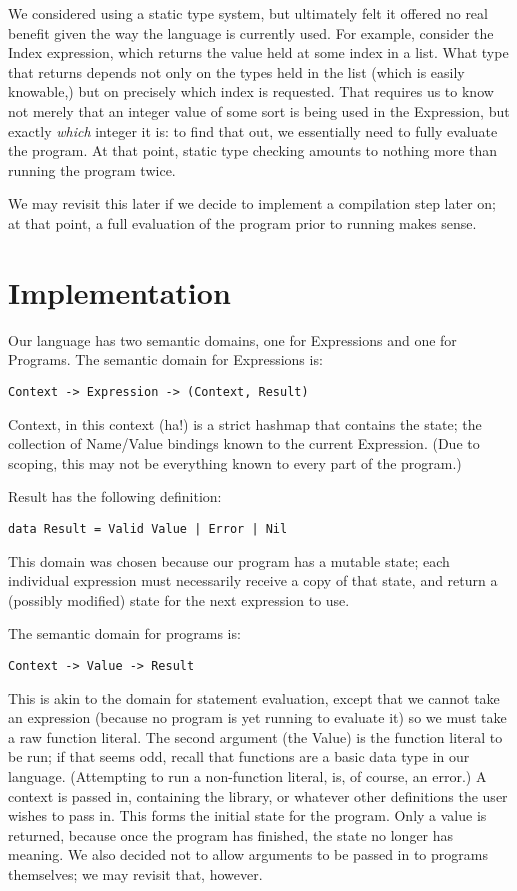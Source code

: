 \documentclass{article}
\begin{document}
We considered using a static type system, but ultimately felt it offered no real benefit given the way the language is currently used.  For example, consider the Index expression, which returns the value held at some index in a list.  What type that returns depends not only on the types held in the list (which is easily knowable,) but on precisely which index is requested.  That requires us to know not merely that an integer value of some sort is being used in the Expression, but exactly \emph{which} integer it is: to find that out, we essentially need to fully evaluate the program.  At that point, static type checking amounts to nothing more than running the program twice.

We may revisit this later if we decide to implement a compilation step later on; at that point, a full evaluation of the program prior to running makes sense.

\section*{Implementation}

Our language has two semantic domains, one for Expressions and one for Programs.  The semantic domain for Expressions is:

\begin{lstlisting}
Context -> Expression -> (Context, Result)
\end{lstlisting}

Context, in this context (ha!) is a strict hashmap that contains the state; the collection of Name/Value bindings known to the current Expression.  (Due to scoping, this may not be everything known to every part of the program.)

Result has the following definition:

\begin{lstlisting}
data Result = Valid Value | Error | Nil
\end{lstlisting}

This domain was chosen because our program has a mutable state; each individual expression must necessarily receive a copy of that state, and return a (possibly modified) state for the next expression to use.

The semantic domain for programs is:

\begin{lstlisting}
Context -> Value -> Result
\end{lstlisting}

This is akin to the domain for statement evaluation, except that we cannot take an expression (because no program is yet running to evaluate it) so we must take a raw function literal. The second argument (the Value) is the function literal to be run; if that seems odd, recall that functions are a basic data type in our language. (Attempting to run a non-function literal, is, of course, an error.)  A context is passed in, containing the library, or whatever other definitions the user wishes to pass in.  This forms the initial state for the program. Only a value is returned, because once the program has finished, the state no longer has meaning.  We also decided not to allow arguments to be passed in to programs themselves; we may revisit that, however.
\end{document}
